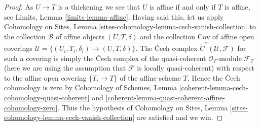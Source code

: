 \documentclass[10pt,a4paper]{amsart}
\theoremstyle{plain}
\theoremstyle{definition}
\theoremstyle{remark}
\numberwithin{equation}{subsection}
\begin{document}
\begin{proof}
As $U \to T$ is a thickening we see that $U$ is affine if and only if $T$
is affine, see Limits, Lemma \ref{limits-lemma-affine}.
Having said this, let us apply
Cohomology on Sites, Lemma \ref{sites-cohomology-lemma-cech-vanish-collection}
to the collection $\mathcal{B}$ of affine objects $(U, T, \delta)$ and the
collection $\text{Cov}$ of affine open coverings
$\mathcal{U} = \{(U_i, T_i, \delta_i) \to (U, T, \delta)\}$. The
{\v C}ech complex
${\check C}^*(\mathcal{U}, \mathcal{F})$ for such a covering is simply
the {\v C}ech complex of the quasi-coherent $\mathcal{O}_T$-module
$\mathcal{F}_T$
(here we are using the assumption that $\mathcal{F}$ is locally quasi-coherent)
with respect to the affine open covering $\{T_i \to T\}$ of the
affine scheme $T$. Hence the {\v C}ech cohomology is zero by
Cohomology of Schemes, Lemma
\ref{coherent-lemma-cech-cohomology-quasi-coherent} and
\ref{coherent-lemma-quasi-coherent-affine-cohomology-zero}.
Thus the hypothesis of
Cohomology on Sites, Lemma \ref{sites-cohomology-lemma-cech-vanish-collection}
are satisfied and we win.
\end{proof}
\end{document}
